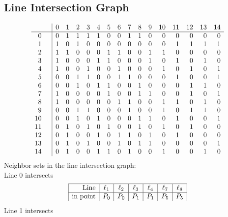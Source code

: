 \documentclass{article}
\begin{document}
{\subsection*{Line Intersection Graph}
{\arraycolsep=1pt
$$
\begin{array}{rr|*{15}r}
 &  & 0 & 1 & 2 & 3 & 4 & 5 & 6 & 7 & 8 & 9 & 10 & 11 & 12 & 13 & 14\\
\hline
0 &  & 0 & 1 & 1 & 1 & 1 & 0 & 0 & 1 & 1 & 0 & 0 & 0 & 0 & 0 & 0\\
1 &  & 1 & 0 & 1 & 0 & 0 & 0 & 0 & 0 & 0 & 0 & 0 & 1 & 1 & 1 & 1\\
2 &  & 1 & 1 & 0 & 0 & 0 & 1 & 1 & 0 & 0 & 1 & 1 & 0 & 0 & 0 & 0\\
3 &  & 1 & 0 & 0 & 0 & 1 & 1 & 0 & 0 & 0 & 1 & 0 & 1 & 0 & 1 & 0\\
4 &  & 1 & 0 & 0 & 1 & 0 & 0 & 1 & 0 & 0 & 0 & 1 & 0 & 1 & 0 & 1\\
5 &  & 0 & 0 & 1 & 1 & 0 & 0 & 1 & 1 & 0 & 0 & 0 & 1 & 0 & 0 & 1\\
6 &  & 0 & 0 & 1 & 0 & 1 & 1 & 0 & 0 & 1 & 0 & 0 & 0 & 1 & 1 & 0\\
7 &  & 1 & 0 & 0 & 0 & 0 & 1 & 0 & 0 & 1 & 1 & 0 & 0 & 1 & 0 & 1\\
8 &  & 1 & 0 & 0 & 0 & 0 & 0 & 1 & 1 & 0 & 0 & 1 & 1 & 0 & 1 & 0\\
9 &  & 0 & 0 & 1 & 1 & 0 & 0 & 0 & 1 & 0 & 0 & 1 & 0 & 1 & 1 & 0\\
10 &  & 0 & 0 & 1 & 0 & 1 & 0 & 0 & 0 & 1 & 1 & 0 & 1 & 0 & 0 & 1\\
11 &  & 0 & 1 & 0 & 1 & 0 & 1 & 0 & 0 & 1 & 0 & 1 & 0 & 1 & 0 & 0\\
12 &  & 0 & 1 & 0 & 0 & 1 & 0 & 1 & 1 & 0 & 1 & 0 & 1 & 0 & 0 & 0\\
13 &  & 0 & 1 & 0 & 1 & 0 & 0 & 1 & 0 & 1 & 1 & 0 & 0 & 0 & 0 & 1\\
14 &  & 0 & 1 & 0 & 0 & 1 & 1 & 0 & 1 & 0 & 0 & 1 & 0 & 0 & 1 & 0\\
\end{array}
$$
}%
Neighbor sets in the line intersection graph:\\
Line 0 intersects 
$$
\begin{array}{|r*{6}{|c}|}
\hline
\mbox{Line}  & \ell_{1} & \ell_{2} & \ell_{3} & \ell_{4} & \ell_{7} & \ell_{8}\\
\hline
\mbox{in point}  & P_{0} & P_{0} & P_{1} & P_{1} & P_{5} & P_{5}\\
\hline
\end{array}
$$
Line 1 intersects 
$$
\begin{array}{|r*{6}{|c}|}

\end{array}$$}
\end{document}
